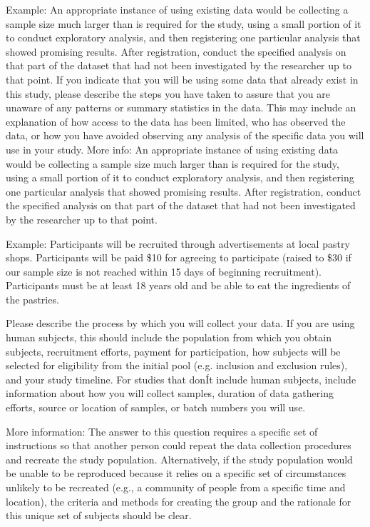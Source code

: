 \documentclass[highlight, explanations]{prereg}
\begin{document}
{Example: An appropriate instance of using existing data would be collecting a sample size much larger than is required for the study, using a small portion of it to conduct exploratory analysis, and then registering one particular analysis that showed promising results. After registration, conduct the specified analysis on that part of the dataset that had not been investigated by the researcher up to that point. }
{If you indicate that you will be using some data that already exist in this study, please describe the steps you have taken to assure that you are unaware of any patterns or summary statistics in the data. This may include an explanation of how access to the data has been limited, who has observed the data, or how you have avoided observing any analysis of the specific data you will use in your study. 
More info: An appropriate instance of using existing data would be collecting a sample size much larger than is required for the study, using a small portion of it to conduct exploratory analysis, and then registering one particular analysis that showed promising results. After registration, conduct the specified analysis on that part of the dataset that had not been investigated by the researcher up to that point. 
}

{Example: Participants will be recruited through advertisements at local pastry shops. Participants will be paid \$10 for agreeing to participate (raised to \$30 if our sample size is not reached within 15 days of beginning recruitment). Participants must be at least 18 years old and be able to eat the ingredients of the pastries.}
{Please describe the process by which you will collect your data. If you are using human subjects, this should include the population from which you obtain subjects, recruitment efforts, payment for participation, how subjects will be selected for eligibility from the initial pool (e.g. inclusion and exclusion rules), and your study timeline. For studies that donÍt include human subjects, include information about how you will collect samples, duration of data gathering efforts, source or location of samples, or batch numbers you will use. 

More information: The answer to this question requires a specific set of instructions so that another person could repeat the data collection procedures and recreate the study population. Alternatively, if the study population would be unable to be reproduced because it relies on a specific set of circumstances unlikely to be recreated (e.g., a community of people from a specific time and location), the criteria and methods for creating the group and the rationale for this unique set of subjects should be clear.
}
\end{document}
